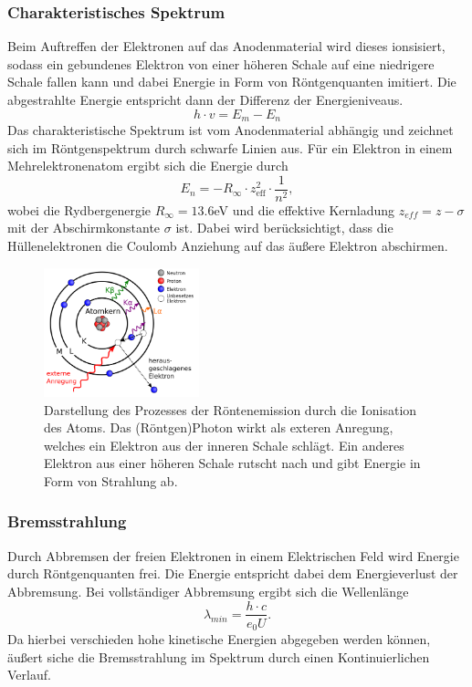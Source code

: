 \subsubsection*{Charakteristisches Spektrum}
Beim Auftreffen der Elektronen auf das Anodenmaterial wird dieses ionsisiert, sodass
ein gebundenes Elektron von einer höheren Schale auf eine niedrigere Schale fallen kann und dabei
Energie in Form von Röntgenquanten imitiert. Die abgestrahlte Energie entspricht dann der Differenz
der Energieniveaus.
\begin{equation}
    h\cdot v=E_m-E_n
\end{equation}
Das charakteristische Spektrum ist vom Anodenmaterial abhängig und zeichnet sich im
Röntgenspektrum durch schwarfe Linien aus.
Für ein Elektron in einem Mehrelektronenatom ergibt sich die Energie durch
\begin{equation}
    E_n=-R_{\infty}\cdot z_{\text{eff}}^2 \cdot \frac{1}{n^2},
\end{equation}
wobei die Rydbergenergie $R_{\infty}=13.6$eV und die effektive Kernladung 
$z_{eff}=z-\sigma$ mit der Abschirmkonstante $\sigma$ ist. Dabei wird berücksichtigt,
dass die Hüllenelektronen die Coulomb Anziehung auf das äußere Elektron abschirmen.
\begin{figure}
    \centering
    \includegraphics[width=0.4\textwidth]{plots/chS.png}
    \caption{Darstellung des Prozesses der Röntenemission durch die
    Ionisation des Atoms. Das (Röntgen)Photon wirkt als exteren Anregung, welches
    ein Elektron aus der inneren Schale schlägt. Ein anderes Elektron aus einer
    höheren Schale rutscht nach und gibt Energie in Form von Strahlung ab.\cite{wiki}}
\end{figure}

\subsubsection*{Bremsstrahlung}
Durch Abbremsen der freien Elektronen in einem Elektrischen Feld 
wird Energie durch Röntgenquanten frei. Die Energie entspricht dabei
dem Energieverlust der Abbremsung. Bei vollständiger Abbremsung ergibt
sich die Wellenlänge
\begin{equation}
    \lambda_{min}=\frac{h \cdot c}{e_0U}.
    \label{eqn:minW}
\end{equation}
Da hierbei verschieden hohe kinetische Energien abgegeben werden können,
äußert siche die Bremsstrahlung im Spektrum durch einen Kontinuierlichen
Verlauf.
